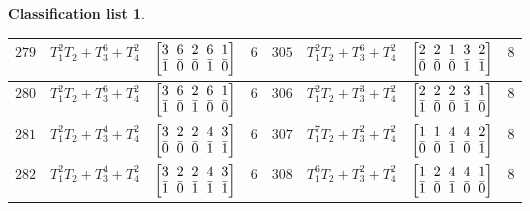 \documentclass[10pt,a4paper]{amsart}
\theoremstyle{definition}
\newtheorem{class-list}[thm]{Classification list}
\numberwithin{equation}{section}
\begin{document}
\begin{class-list}
\begin{table}[h!]
\begin{tabu}{c|c|c|c||c|c|c|c}
\\
\hline
${279}$&${T_{1}^{2}T_{2}+T_{3}^{6}+T_{4}^{2}}$
&$\arraycolsep=1mm\begin{bmatrix}{3} & {6} & {2} & {6} & {1} \\ {\bar{1}} & {\bar{0}} & {\bar{0}} & {\bar{1}} & {\bar{0}}\end{bmatrix}$&${6}$
&${305}$&${T_{1}^{2}T_{2}+T_{3}^{6}+T_{4}^{2}}$
&$\arraycolsep=1mm\begin{bmatrix}{2} & {2} & {1} & {3} & {2} \\ {\bar{0}} & {\bar{0}} & {\bar{0}} & {\bar{1}} & {\bar{1}}\end{bmatrix}$&${8}$
\\
\hline
${280}$&${T_{1}^{2}T_{2}+T_{3}^{6}+T_{4}^{2}}$
&$\arraycolsep=1mm\begin{bmatrix}{3} & {6} & {2} & {6} & {1} \\ {\bar{1}} & {\bar{0}} & {\bar{1}} & {\bar{0}} & {\bar{0}}\end{bmatrix}$&${6}$
&${306}$&${T_{1}^{2}T_{2}+T_{3}^{3}+T_{4}^{2}}$
&$\arraycolsep=1mm\begin{bmatrix}{2} & {2} & {2} & {3} & {1} \\ {\bar{1}} & {\bar{0}} & {\bar{0}} & {\bar{1}} & {\bar{0}}\end{bmatrix}$&${8}$
\\
\hline
${281}$&${T_{1}^{2}T_{2}+T_{3}^{4}+T_{4}^{2}}$
&$\arraycolsep=1mm\begin{bmatrix}{3} & {2} & {2} & {4} & {3} \\ {\bar{0}} & {\bar{0}} & {\bar{0}} & {\bar{1}} & {\bar{1}}\end{bmatrix}$&${6}$
&${307}$&${T_{1}^{7}T_{2}+T_{3}^{2}+T_{4}^{2}}$
&$\arraycolsep=1mm\begin{bmatrix}{1} & {1} & {4} & {4} & {2} \\ {\bar{0}} & {\bar{0}} & {\bar{1}} & {\bar{0}} & {\bar{1}}\end{bmatrix}$&${8}$
\\
\hline
${282}$&${T_{1}^{2}T_{2}+T_{3}^{4}+T_{4}^{2}}$
&$\arraycolsep=1mm\begin{bmatrix}{3} & {2} & {2} & {4} & {3} \\ {\bar{1}} & {\bar{0}} & {\bar{1}} & {\bar{1}} & {\bar{1}}\end{bmatrix}$&${6}$
&${308}$&${T_{1}^{6}T_{2}+T_{3}^{2}+T_{4}^{2}}$
&$\arraycolsep=1mm\begin{bmatrix}{1} & {2} & {4} & {4} & {1} \\ {\bar{1}} & {\bar{0}} & {\bar{1}} & {\bar{0}} & {\bar{0}}\end{bmatrix}$&${8}$

\end{tabu}
\end{table}
\end{class-list}
\end{document}
